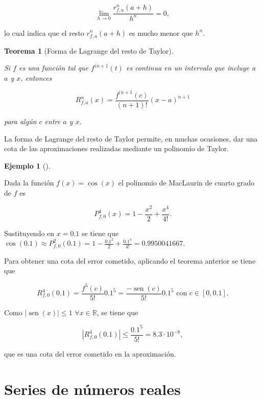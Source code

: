 \documentclass[
  a4paper,
]{scrreport}
\theoremstyle{plain}
\theoremstyle{plain}
\theoremstyle{definition}
\theoremstyle{definition}
\newtheorem{example}{Ejemplo}[chapter]
\theoremstyle{plain}
\newtheorem{theorem}{Teorema}[chapter]
\theoremstyle{remark}
\begin{document}
\[
\lim_{h\rightarrow 0}\frac{r_{f,a}^n(a+h)}{h^n}=0,
\]

lo cual indica que el resto \(r_{f,a}^n(a+h)\) es mucho menor que
\(h^n\).

\leavevmode{}%
\begin{theorem}[Forma de Lagrange del resto de
Taylor]\label{thm-forma-Lagrange-resto}

Si \(f\) es una función tal que \(f^{(n+1}(t)\) es continua en un
intervalo que incluye a \(a\) y \(x\), entonces

\[
R^n_{f,a}(x)=\frac{f^{(n+1}(c)}{(n+1)!}(x-a)^{n+1}
\]

para algún \(c\) entre \(a\) y \(x\).

\end{theorem}

La forma de Lagrange del resto de Taylor permite, en muchas ocasiones,
dar una cota de las aproximaciones realizadas mediante un polinomio de
Taylor.

\leavevmode{}%
\begin{example}[]\label{exm-cota-resto}

Dada la función \(f(x)=\cos(x)\) el polinomio de MacLaurin de cuarto
grado de \(f\) es

\[
P^4_{f,0}(x)=1-\frac{x^2}{2}+\frac{x^4}{4!}.
\]

Sustituyendo en \(x=0.1\) se tiene que
\(\cos(0.1)\approx P^2_{f,0}(0.1) = 1-\frac{0.1^2}{2}+\frac{0.1^4}{4!}= 0.9950041667\).

Para obtener una cota del error cometido, aplicando el teorema anterior
se tiene que

\[
R^4_{f,0}(0.1)=\frac{f^{5}(c)}{5!}0.1^5 = \frac{-\operatorname{sen}(c)}{5!}0.1^5 \mbox{ con }c\in [0,0.1].
\]

Como \(|\operatorname{sen}(x)|\leq 1\) \(\forall x\in\mathbb{R}\), se
tiene que

\[
|R^4_{f,0}(0.1)|\leq \frac{0.1^5}{5!} = 8.3\cdot 10^{-8},
\]

que es una cota del error cometido en la aproximación.

\end{example}


\hypertarget{series-de-nuxfameros-reales}{%
\chapter{Series de números reales}\label{series-de-nuxfameros-reales}}
\end{document}
